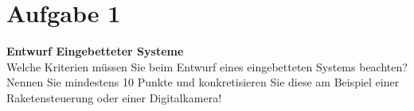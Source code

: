 \documentclass[12pt,a4paper,ngerman]{article}
\begin{document}


%
%

\section{Aufgabe 1}


\begin{framed}
\textbf{Entwurf Eingebetteter Systeme}\\
Welche Kriterien müssen Sie beim Entwurf eines eingebetteten Systems beachten? Nennen Sie mindestens 10 Punkte und konkretisieren Sie diese am Beispiel einer Raketensteuerung oder einer Digitalkamera!
\end{framed}
\end{document}

